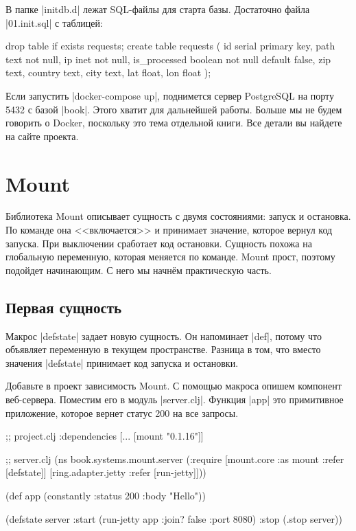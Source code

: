 В папке \spverb|initdb.d| лежат SQL-файлы для старта базы. Достаточно файла
\spverb|01.init.sql| с таблицей:

\begin{english}
  \begin{sql}
drop table if exists requests;
create table requests (
    id            serial primary key,
    path          text not null,
    ip            inet not null,
    is_processed  boolean not null default false,
    zip           text,
    country       text,
    city          text,
    lat           float,
    lon           float
);
  \end{sql}
\end{english}

Если запустить \spverb|docker-compose up|, поднимется сервер PostgreSQL на порту
5432 с базой \spverb|book|. Этого хватит для дальнейшей работы. Больше мы не
будем говорить о Docker, поскольку это тема отдельной книги. Все детали вы
найдете на сайте проекта.

\section{Mount}

Библиотека Mount описывает сущность с
двумя состояниями: запуск и остановка. По команде она <<включается>> и принимает
значение, которое вернул код запуска. При выключении сработает код
остановки. Сущность похожа на глобальную переменную, которая меняется по
команде. Mount прост, поэтому подойдет начинающим. С него мы начн\"{е}м
практическую часть.

\subsection{Первая сущность}

Макрос \spverb|defstate| задает новую сущность. Он напоминает \spverb|def|,
потому что объявляет переменную в текущем пространстве. Разница в том, что
вместо значения \spverb|defstate| принимает код запуска и остановки.

Добавьте в проект зависимость Mount. С помощью макроса опишем компонент
веб-сервера. Поместим его в модуль \spverb|server.clj|. Функция \spverb|app| это
примитивное приложение, которое вернет статус 200 на все запросы.

\begin{english}
  \begin{clojure}
;; project.clj
:dependencies [... [mount "0.1.16"]]

;; server.clj
(ns book.systems.mount.server
  (:require
   [mount.core :as mount :refer [defstate]]
   [ring.adapter.jetty :refer [run-jetty]]))

(def app (constantly {:status 200 :body "Hello"}))

(defstate server
  :start (run-jetty app {:join? false :port 8080})
  :stop (.stop server))
  \end{clojure}
\end{english}

